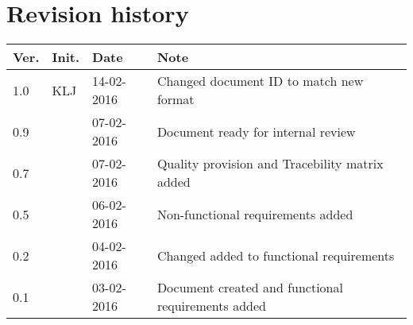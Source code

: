 \label{chp_revisionHistory}
\chapter{Revision history}

\begin{tabular}{b{1cm} b{1cm} b{2cm} b{8cm}}
    \textbf{Ver.} & \textbf{Init.} & \textbf{Date} & \textbf{Note} \\
    \hline
    1.0 & KLJ & 14-02-2016 & Changed document ID to match new format \\
    0.9 & & 07-02-2016 & Document ready for internal review \\
    0.7 & & 07-02-2016 & Quality provision and Tracebility matrix added \\
   	0.5 & & 06-02-2016 & Non-functional requirements added \\
	0.2 & & 04-02-2016 & Changed added to functional requirements \\
    0.1 & & 03-02-2016 & Document created and functional requirements added  \\
\end{tabular}

